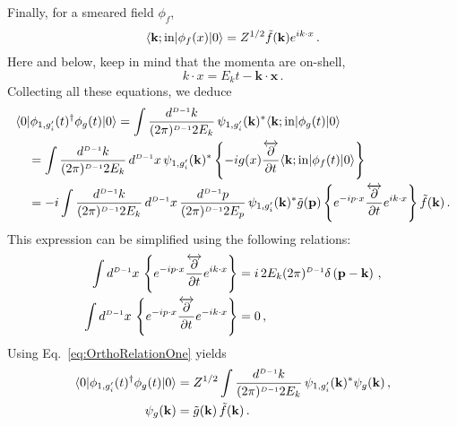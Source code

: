 Finally, for a smeared field $\phi_{f}$,
\begin{equation}
    \label{eq:SmearedFieldOneParticleME}
    \langle \mathbf{k};\mathrm{in} | \phi_f(x) | 0 \rangle = 
        Z^{1/2} \tilde{f}(\mathbf{k}) e^{ik\cdot x}\, .
\end{equation}
Here and below, keep in mind that the momenta are on-shell, 
\begin{equation}
    \label{eq:OnShellMomenta}
    k\cdot x = E_k t - \mathbf{k} \cdot \mathbf{x}\, .
\end{equation}
Collecting all these equations, we deduce
\begin{align}
    &\langle 0 | \phi_{1,g'_i}(t)^\dagger \phi_{g}(t) | 0 \rangle 
        = \int \frac{d^{\scriptscriptstyle{D-1}}k}{(2\pi)^{\scriptscriptstyle{D-1}} 2E_k}\, 
        \psi_{1,g'_i}(\mathbf{k})^* \langle \mathbf{k};\mathrm{in} | \phi_{g}(t) | 0 \rangle \\
    & \quad = \int \frac{d^{\scriptscriptstyle{D-1}}k}{(2\pi)^{\scriptscriptstyle{D-1}} 2E_k}\, d^{\scriptscriptstyle{D-1}}x\, 
        \psi_{1,g'_i}(\mathbf{k})^* \left\{ -i g(x) 
        \frac{\overleftrightarrow{\partial}}{\partial t}
        \langle \mathbf{k};\mathrm{in} | \phi_{f}(t) | 0 \rangle \right\} \\
    & \quad = -i \int \frac{d^{\scriptscriptstyle{D-1}}k}{(2\pi)^{\scriptscriptstyle{D-1}} 2E_k}\, d^{\scriptscriptstyle{D-1}}x\, 
        \frac{d^{\scriptscriptstyle{D-1}}p}{(2\pi)^{\scriptscriptstyle{D-1}} 2E_p}\,
        \psi_{1,g'_i}(\mathbf{k})^* \tilde{g}(\mathbf{p}) 
        \left\{ e^{-ip\cdot x}
        \frac{\overleftrightarrow{\partial}}{\partial t}
        e^{i k\cdot x}\right\} \tilde{f}(\mathbf{k})\, .
\end{align}
This expression can be simplified using the following relations: 
\begin{align}
    \label{eq:OrthoRelationOne}
    \int d^{\scriptscriptstyle{D-1}}x\, 
        \left\{ e^{-ip\cdot x}
            \frac{\overleftrightarrow{\partial}}{\partial t}
            e^{i k\cdot x}
        \right\} &= 
        i\, 2E_k (2\pi)^{\scriptscriptstyle{D-1}} \delta\left(\mathbf{p}-\mathbf{k}\right)\, , \\
    \label{eq:OrthoRelationTwo}
    \int d^{\scriptscriptstyle{D-1}}x\, 
        \left\{ e^{-ip\cdot x}
            \frac{\overleftrightarrow{\partial}}{\partial t}
            e^{-i k\cdot x}
        \right\} &= 
        0\, ,    
\end{align}
Using Eq.~\eqref{eq:OrthoRelationOne} yields
\begin{align}
    \label{eq:PhigMatrixElement}
    \langle 0 | \phi_{1,g'_i}(t)^\dagger \phi_{g}(t) | 0 \rangle 
    &= Z^{1/2} \int \frac{d^{\scriptscriptstyle{D-1}}k}{(2\pi)^{\scriptscriptstyle{D-1}} 2E_k}\,
    \psi_{1,g'_i}(\mathbf{k})^* \psi_g(\mathbf{k})\, , \\
    \psi_g(\mathbf{k})
    &= \tilde{g}(\mathbf{k})\, \tilde{f}(\mathbf{k})\, .
\end{align}
